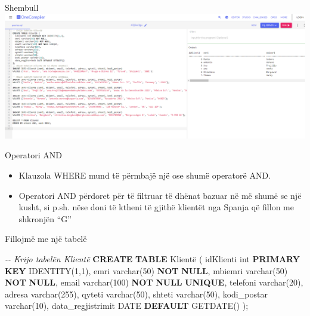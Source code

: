 \documentclass[
  ignorenonframetext,
]{beamer}
\newenvironment{Shaded}{\begin{snugshade}}{\end{snugshade}}
\newcommand{\CommentTok}[1]{\textcolor[rgb]{0.56,0.35,0.01}{\textit{#1}}}
\newcommand{\DataTypeTok}[1]{\textcolor[rgb]{0.13,0.29,0.53}{#1}}
\newcommand{\DecValTok}[1]{\textcolor[rgb]{0.00,0.00,0.81}{#1}}
\newcommand{\KeywordTok}[1]{\textcolor[rgb]{0.13,0.29,0.53}{\textbf{#1}}}
\newcommand{\NormalTok}[1]{#1}
\begin{document}
\begin{frame}{Shembull}
\label{shembull-20}
\includegraphics{./Figs/query13.png}
\end{frame}

\begin{frame}{Operatori AND}
\label{operatori-and}
\begin{itemize}
\item
  Klauzola WHERE mund të përmbajë një ose shumë operatorë AND.
\item
  Operatori AND përdoret për të filtruar të dhënat bazuar në më shumë se
  një kusht, si p.sh. nëse doni të ktheni të gjithë klientët nga Spanja
  që fillon me shkronjën ``G''
\end{itemize}
\end{frame}

\begin{frame}[fragile]{Fillojmë me një tabelë}
\label{fillojmuxeb-me-njuxeb-tabeluxeb-4}

\begin{Shaded}
\begin{Highlighting}[]
\CommentTok{{-}{-} Krijo tabelën Klientë}
\KeywordTok{CREATE} \KeywordTok{TABLE}\NormalTok{ Klientë (}
\NormalTok{  idKlienti }\DataTypeTok{int} \KeywordTok{PRIMARY} \KeywordTok{KEY}\NormalTok{ IDENTITY(}\DecValTok{1}\NormalTok{,}\DecValTok{1}\NormalTok{),}
\NormalTok{  emri }\DataTypeTok{varchar}\NormalTok{(}\DecValTok{50}\NormalTok{) }\KeywordTok{NOT} \KeywordTok{NULL}\NormalTok{,}
\NormalTok{  mbiemri }\DataTypeTok{varchar}\NormalTok{(}\DecValTok{50}\NormalTok{) }\KeywordTok{NOT} \KeywordTok{NULL}\NormalTok{,}
\NormalTok{  email }\DataTypeTok{varchar}\NormalTok{(}\DecValTok{100}\NormalTok{) }\KeywordTok{NOT} \KeywordTok{NULL} \KeywordTok{UNIQUE}\NormalTok{,}
\NormalTok{  telefoni }\DataTypeTok{varchar}\NormalTok{(}\DecValTok{20}\NormalTok{),}
\NormalTok{  adresa }\DataTypeTok{varchar}\NormalTok{(}\DecValTok{255}\NormalTok{),}
\NormalTok{  qyteti }\DataTypeTok{varchar}\NormalTok{(}\DecValTok{50}\NormalTok{),}
\NormalTok{  shteti }\DataTypeTok{varchar}\NormalTok{(}\DecValTok{50}\NormalTok{),}
\NormalTok{  kodi\_postar }\DataTypeTok{varchar}\NormalTok{(}\DecValTok{10}\NormalTok{),}
\NormalTok{  data\_regjistrimit }\DataTypeTok{DATE} \KeywordTok{DEFAULT}\NormalTok{ GETDATE()}
\NormalTok{);}
\end{Highlighting}
\end{Shaded}
\end{frame}
\end{document}
